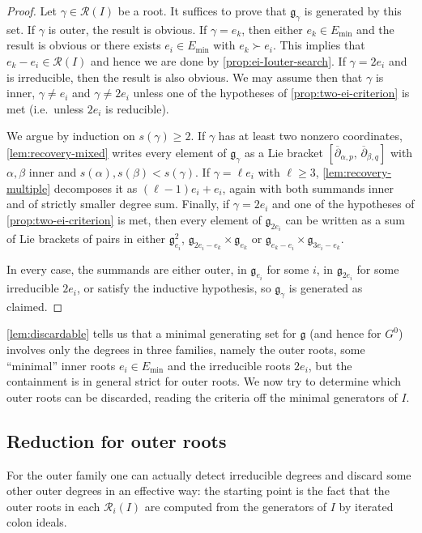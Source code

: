 \documentclass[11pt,letterpaper,reqno]{amsart}
\theoremstyle{remark}
\theoremstyle{definition}
\newcommand{\R}{\mathcal R}
\begin{document}
\begin{proof}
Let $\gamma\in\mathcal R(I)$ be a root. It suffices to prove that $\mathfrak g_\gamma$ is generated by this set. If $\gamma$ is outer, the result is obvious. If $\gamma=e_k$, then either $e_k\in E_\mathrm{min}$ and the result is obvious or there exists $e_i\in E_\mathrm{min}$ with $e_k\succ e_i$. This implies that $e_k-e_i\in\R(I)$ and hence we are done by \cref{prop:ei-Iouter-search}. If $\gamma=2e_i$ and is irreducible, then the result is also obvious. We may assume then that $\gamma$ is inner, $\gamma\neq e_i$ and $\gamma\neq 2e_i$ unless one of the hypotheses of \cref{prop:two-ei-criterion} is met (i.e.~unless $2e_i$ is reducible).

We argue by induction on $s(\gamma)\geq2$. If $\gamma$ has at least two nonzero
coordinates, \cref{lem:recovery-mixed} writes every element of
$\mathfrak g_\gamma$ as a Lie bracket
$[\overline\partial_{\alpha,p},\,\overline\partial_{\beta,q}]$ with
$\alpha,\beta$ inner and
$s(\alpha),s(\beta)<s(\gamma)$. If $\gamma=\ell e_i$ with $\ell\geq3$,
\cref{lem:recovery-multiple} decomposes it as $(\ell-1)e_i+e_i$, again with
both summands inner and of strictly smaller degree sum. Finally, if $\gamma=2e_i$ and one of the hypotheses of \cref{prop:two-ei-criterion} is met, then every element of $\mathfrak g_{2e_i}$ can be written as a sum of Lie brackets of pairs in either $\mathfrak g_{e_i}^2$, $\mathfrak g_{2e_i-e_k}\times\mathfrak g_{e_k}$ or $\mathfrak g_{e_k-e_i}\times\mathfrak g_{3e_i-e_k}$.

In every case, the summands are either outer, in $\mathfrak g_{e_i}$ for some $i$, in $\mathfrak g_{2e_i}$ for some irreducible $2e_i$, or satisfy the inductive hypothesis, so $\mathfrak g_\gamma$ is generated as claimed.
\end{proof}

\cref{lem:discardable} tells us that a minimal generating set for $\mathfrak g$ (and hence for $G^0$) involves only the degrees in three families, namely the outer roots, some ``minimal'' inner roots $e_i\in E_\mathrm{min}$ and the irreducible roots $2e_i$, but the
containment is in general strict for outer roots. We now try to determine which outer roots can be discarded, reading the criteria off the minimal generators of $I$.

\subsection{Reduction for outer roots} For the outer family one can actually detect irreducible degrees and discard some other outer degrees in an effective way: the starting point is the fact that the outer roots in each $\R_i(I)$ are computed from the generators of $I$ by iterated colon ideals.
\end{document}
